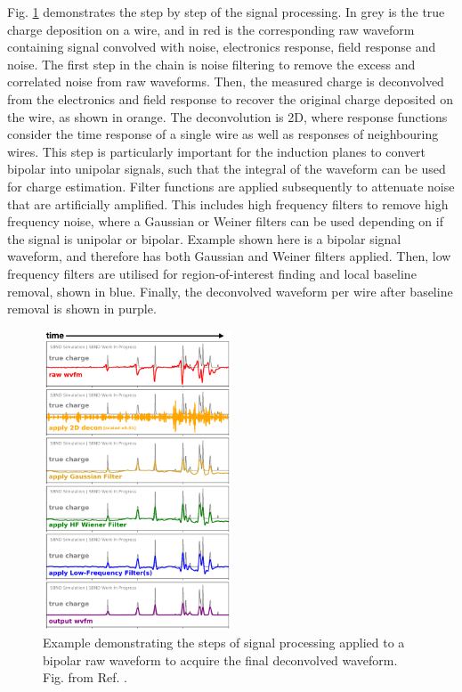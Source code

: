 Fig. \ref{fig:signal_processing_steps} \cite{} demonstrates the step by step of the signal processing.
In grey is the true charge deposition on a wire, and in red is the corresponding raw waveform containing signal convolved with noise, electronics response, field response and noise.
The first step in the chain is noise filtering to remove the excess and correlated noise from raw waveforms.
Then, the measured charge is deconvolved from the electronics and field response to recover the original charge deposited on the wire, as shown in orange.
The deconvolution is 2D, where response functions consider the time response of a single wire as well as responses of neighbouring wires.
This step is particularly important for the induction planes to convert bipolar into unipolar signals, such that the integral of the waveform can be used for charge estimation.
Filter functions are applied subsequently to attenuate noise that are artificially amplified.
This includes high frequency filters to remove high frequency noise, where a Gaussian or Weiner filters can be used depending on if the signal is unipolar or bipolar.
Example shown here is a bipolar signal waveform, and therefore has both Gaussian and Weiner filters applied.
Then, low frequency filters are utilised for region-of-interest finding and local baseline removal, shown in blue.
Finally, the deconvolved waveform per wire after baseline removal is shown in purple.
\begin{figure}[tbp!] 
\centering    
\includegraphics[width=0.5\textwidth]{signal_processing_steps}
\caption[signal_processing_steps]{
Example demonstrating the steps of signal processing applied to a bipolar raw waveform to acquire the final deconvolved waveform.
Fig. from Ref. \cite{}.
}
\label{fig:signal_processing_steps}
\end{figure}

